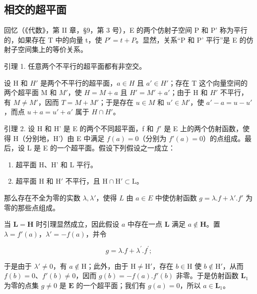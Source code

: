 \subsection{相交的超平面}

回忆（《代数》，第 II 章，§9，第 3 号），E 的两个仿射子空间 P 和 P' 称为平行的，如果存在 T 中的向量 t，使 \(P' = t + P\)。显然，关系“P 和 P' 平行”是 E 的仿射子空间集上的等价关系。

引理 1. 任意两个不平行的超平面都有非空交。

设 H 和 \(H'\) 是两个不平行的超平面，\(a \in H\) 且 \(a' \in H'\)；存在 T 这个向量空间的两个超平面 M 和 \(M'\)，使 \(H = M + a\) 且 \(H' = M' + a'\)；由于 H 和 \(H'\) 不平行，有 \(M \neq M'\)，因而 \(T = M + M'\)；于是存在 \(u \in M\) 和 \(u' \in M'\)，使 \(a' - a = u - u'\)，而点 \(u + a = u' + a'\) 属于 \(H \cap H'\)。

引理 2. 设 H 和 H' 是 E 的两个不同超平面，f 和 \(f'\) 是 E 上的两个仿射函数，使得 H（分别地，H'）由 E 中满足 \(f(a) = 0\)（分别为 \(f'(a) = 0\)）的点组成。最后，设 L 是 E 的一个超平面。假设下列假设之一成立：

\begin{enumerate}
\def\labelenumi{\alph{enumi})}
\item
  超平面 H、H' 和 L 平行。
\item
  超平面 H 和 \(\mathrm{H}'\) 不平行，且 \(\mathrm{H} \cap \mathrm{H}' \subset \mathrm{L}\)。
\end{enumerate}

那么存在不全为零的实数 \(\lambda, \lambda'\)，使得 \(L\) 由 \(a \in E\) 中使仿射函数 \(g = \lambda.f + \lambda'.f'\) 为零的那些点组成。

当 \(\mathbf{L} = \mathbf{H}\) 时引理显然成立，因此假设 \(a\) 中存在一点 \(\mathbf{L}\) 满足 \(a \notin \mathbf{H}\)。置 \(\lambda = f'(a)\)，\(\lambda' = -f(a)\)，并令

\[
g = \lambda . f + \lambda^ {\prime}. f ^ {\prime};
\]

于是由于 \(\lambda' \neq 0\)，有 \(a \notin \mathrm{H}\)；此外，由于 \(\mathrm{H} \neq \mathrm{H}'\)，存在 \(b \in \mathrm{H}\) 使 \(b \notin \mathrm{H}'\)，从而 \(f(b) = 0\)、\(f'(b) \neq 0\)，因而 \(g(b) = -f(a).f'(b)\) 非零。于是仿射函数 \(\mathbf{L}_1\) 为零的点集 \(g \neq 0\) 是 \(\mathbf{E}\) 的一个超平面；我们有 \(g(a) = 0\)，所以 \(a \in \mathbf{L}_1\)。

